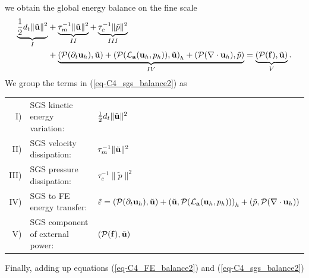 we obtain the global energy balance on the fine scale
\begin{align}
\label{eq-C4_sgs_balance2}
\underbrace{\frac{1}{2}d_t\|\tilde{{\bf u}}\|^2}_I
&+\underbrace{\tau_m^{-1}\|\tilde{{\bf u}}\|^2}_{II}
+\underbrace{\tau_c^{-1}\|\tilde{p}\|^2}_{III} \\ \nonumber
&+\underbrace{\left(\mathcal{P}(\partial_t{\bf u}_h),\tilde{{\bf u}}\right)
+\left(\mathcal{P}(\mathcal{L}_{{\bf a}}({\bf u}_h,p_h)),\tilde{{\bf u}}\right)_h
+\left(\mathcal{P}(\nabla\cdot{\bf u}_h),\tilde{p}\right)}_{IV}
=\underbrace{\left(\mathcal{P}({\bf f}),\tilde{{\bf u}}\right)}_V.
\end{align}
We group the terms in (\ref{eq-C4_sgs_balance2}) as
\begin{center}
\begin{tabular}{rll}
I)&SGS kinetic energy variation:&$\frac{1}{2}d_t\|\tilde{{\bf u}}\|^2$\\
II)&SGS velocity dissipation:&$\tau_m^{-1}\|\tilde{{\bf u}}\|^2$\\
III)&SGS pressure dissipation:&$\tau_c^{-1}\|\tilde{p}\|^2$\\
IV)&SGS to FE energy transfer:&$\tilde{\varepsilon}= \left(\mathcal{P}(\partial_t{\bf u}_h),\tilde{{\bf u}}\right)+\left(\tilde{{\bf u}},\mathcal{P}(\mathcal{L}_{{\bf a}}({\bf u}_h,p_h))\right)_h+\left(\tilde{p},\mathcal{P}(\nabla\cdot{\bf u}_h)\right)$\\
V)&SGS component of external power:&$\left(\mathcal{P}({\bf f}),\tilde{{\bf u}}\right)$\\
\end{tabular}
\end{center}
Finally, adding up equations (\ref{eq-C4_FE_balance2}) and (\ref{eq-C4_sgs_balance2}) 
